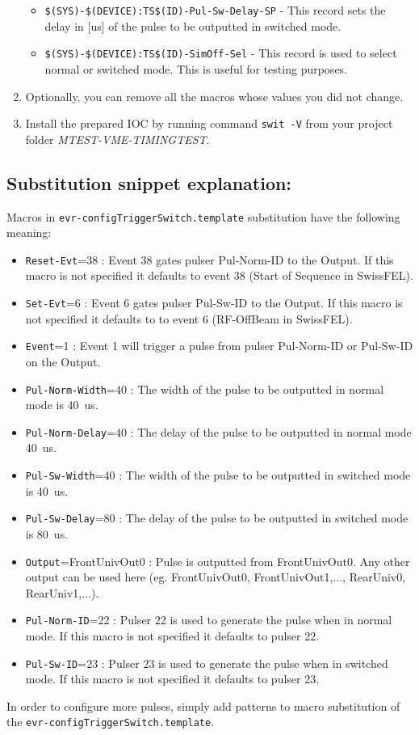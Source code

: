 \documentclass[12pt,a4paper]{article}
\begin{document}
\begin{enumerate}
\begin{itemize}
		\item \texttt{\$(SYS)-\$(DEVICE):TS\$(ID)-Pul-Sw-Delay-SP} - This record sets the delay in [us] of the pulse to be outputted in switched mode.
		
		\item \texttt{\$(SYS)-\$(DEVICE):TS\$(ID)-SimOff-Sel} - This record is used to select normal or switched mode. This is useful for testing purposes.
	\end{itemize}
	
	\item Optionally, you can remove all the macros whose values you did not change. 
	\item Install the prepared IOC by running command \texttt{swit -V} from your project folder \textit{MTEST-VME-TIMINGTEST}.
\end{enumerate}
\subsection{Substitution snippet explanation:}\label{sec:explain_2pulsers}
Macros in \texttt{evr-configTriggerSwitch.template} substitution have the following meaning:
\begin{itemize}
	\item \texttt{Reset-Evt}=38 : Event 38 gates pulser Pul-Norm-ID to the Output. If this macro is not specified it defaults to event 38 (Start of Sequence in SwissFEL).
	\item \texttt{Set-Evt}=6 : Event 6 gates pulser Pul-Sw-ID to the Output. If this macro is not specified it defaults to to event 6 (RF-OffBeam in SwissFEL).
	\item \texttt{Event}=1 : Event 1 will trigger a pulse from pulser Pul-Norm-ID or Pul-Sw-ID on the Output.
	\item \texttt{Pul-Norm-Width}=40 : The width of the pulse to be outputted in normal mode is 40~us.
	\item \texttt{Pul-Norm-Delay}=40 : The delay of the pulse to be outputted in normal mode 40~us.
	\item \texttt{Pul-Sw-Width}=40 : The width of the pulse to be outputted in switched mode is 40~us.
	\item \texttt{Pul-Sw-Delay}=80 : The delay of the pulse to be outputted in switched mode is 80~us.
	\item \texttt{Output}=FrontUnivOut0 : Pulse is outputted from FrontUnivOut0. Any other output can be used here (eg. FrontUnivOut0, FrontUnivOut1,..., RearUniv0, RearUniv1,...).
	\item \texttt{Pul-Norm-ID}=22 : Pulser 22 is used to generate the pulse when in normal mode. If this macro is not specified it defaults to pulser 22.
	\item \texttt{Pul-Sw-ID}=23 : Pulser 23 is used to generate the pulse when in switched mode. If this macro is not specified it defaults to pulser 23.
\end{itemize}
In order to configure more pulses, simply add patterns to macro substitution of the \texttt{evr-configTriggerSwitch.template}.
\end{document}
